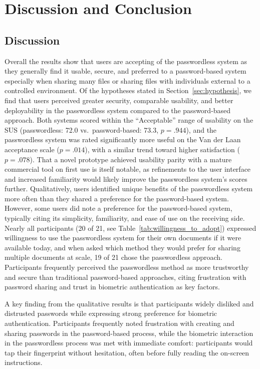 \chapter{Discussion and Conclusion}
\label{ch:discussion}

\section{Discussion}
\label{sec:discussion}

Overall the results show that users are accepting of the passwordless system as they generally find it usable, secure, and preferred to a password-based system especially when sharing many files or sharing files with individuals external to a controlled environment. Of the hypotheses stated in Section~\ref{sec:hypothesis}, we find that users perceived greater security, comparable usability, and better deployability in the passwordless system compared to the password-based approach. Both systems scored within the ``Acceptable'' range of usability on the SUS (passwordless: 72.0 vs.\ password-based: 73.3, $p=.944$), and the passwordless system was rated significantly more useful on the Van der Laan acceptance scale ($p=.014$), with a similar trend toward higher satisfaction ($p=.078$). That a novel prototype achieved usability parity with a mature commercial tool on first use is itself notable, as refinements to the user interface and increased familiarity would likely improve the passwordless system's scores further. Qualitatively, users identified unique benefits of the passwordless system more often than they shared a preference for the password-based system. However, some users did note a preference for the password-based system, typically citing its simplicity, familiarity, and ease of use on the receiving side. Nearly all participants (20 of 21, see Table~\ref{tab:willingness_to_adopt}) expressed willingness to use the passwordless system for their own documents if it were available today, and when asked which method they would prefer for sharing multiple documents at scale, 19 of 21 chose the passwordless approach. Participants frequently perceived the passwordless method as more trustworthy and secure than traditional password-based approaches, citing frustration with password sharing and trust in biometric authentication as key factors.

A key finding from the qualitative results is that participants widely disliked and distrusted passwords while expressing strong preference for biometric authentication. Participants frequently noted frustration with creating and sharing passwords in the password-based process, while the biometric interaction in the passwordless process was met with immediate comfort: participants would tap their fingerprint without hesitation, often before fully reading the on-screen instructions.

